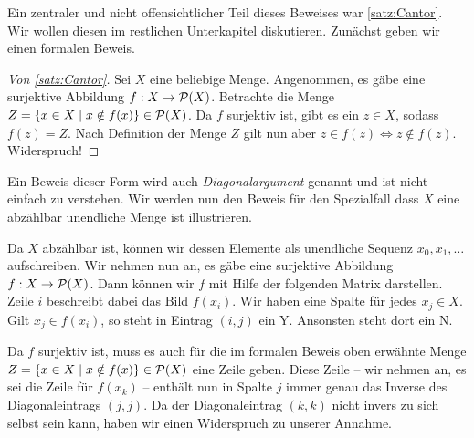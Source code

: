 Ein zentraler und nicht offensichtlicher Teil dieses Beweises war \autoref{satz:Cantor}.
Wir wollen diesen im restlichen Unterkapitel diskutieren.
Zunächst geben wir einen formalen Beweis.

\begin{proof}[Von \autoref{satz:Cantor}]
	Sei $X$ eine beliebige Menge.
	Angenommen, es gäbe eine surjektive Abbildung $f:X\rightarrow\mathcal{P}(X)$.
	Betrachte die Menge $Z=\{x\in X\mid x\notin f(x)\}\in\mathcal{P}(X)$.
	Da $f$ surjektiv ist, gibt es ein $z\in X$, sodass $f(z)=Z$.
	Nach Definition der Menge $Z$ gilt nun aber $z\in f(z)\Leftrightarrow z\notin f(z)$. Widerspruch!
\end{proof}

Ein Beweis dieser Form wird auch \emph{Diagonalargument} genannt und ist nicht einfach zu verstehen.
Wir werden nun den Beweis für den Spezialfall dass $X$ eine abzählbar unendliche Menge ist illustrieren.

Da $X$ abzählbar ist, können wir dessen Elemente als unendliche Sequenz $x_0,x_1,\ldots$ aufschreiben.
Wir nehmen nun an, es gäbe eine surjektive Abbildung $f:X\rightarrow\mathcal{P}(X)$.
Dann können wir $f$ mit Hilfe der folgenden Matrix darstellen.
Zeile $i$ beschreibt dabei das Bild $f(x_i)$. 
Wir haben eine Spalte für jedes $x_j\in X$.
Gilt $x_j\in f(x_i)$, so steht in Eintrag $(i,j)$ ein Y. Ansonsten steht dort ein N.

Da $f$ surjektiv ist, muss es auch für die im formalen Beweis oben erwähnte Menge $Z=\{x\in X\mid x\notin f(x)\}\in\mathcal{P}(X)$ eine Zeile geben.
Diese Zeile -- wir nehmen an, es sei die Zeile für $f(x_k)$ -- enthält nun in Spalte $j$ immer genau das Inverse des Diagonaleintrags $(j, j)$.
Da der Diagonaleintrag $(k,k)$ nicht invers zu sich selbst sein kann, haben wir einen Widerspruch zu unserer Annahme.


